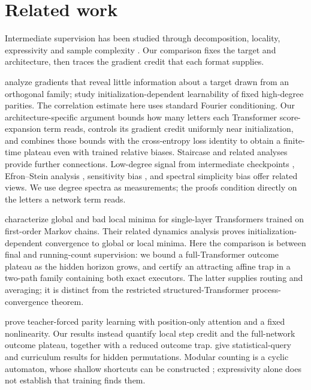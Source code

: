 \section{Related work}
\label{sec:related}

Intermediate supervision has been studied through decomposition, locality, expressivity and
sample complexity \citep{nye2021scratchpads,wies2023subtask,prystawski2023think,abbe2024globality,
feng2023towards,merrill2024expressive,malach2023autoregressive,hanneke2026samplecomplexityautoregressivereasoning,wen2024sparse}.
Our comparison fixes the target and architecture, then traces the gradient credit that each format supplies.

\citet{shalevshwartz2017failures} analyze gradients that reveal little information
about a target drawn from an orthogonal family; \citet{abbe2025parities} study
initialization-dependent learnability of fixed high-degree parities.
The correlation estimate here uses standard Fourier conditioning. Our architecture-specific
argument bounds how many letters each Transformer score-expansion term reads, controls
its gradient credit uniformly near initialization, and combines those bounds with the
cross-entropy loss identity to obtain a finite-time plateau even with trained relative biases.
Staircase and related analyses
\citep{abbe2021staircase,abbe2022mergedstaircase,abbe2023sgd} provide further connections.
Low-degree signal from intermediate checkpoints \citep{panigrahi2025progressive}, Efron--Stein
analysis \citep{li2025noise}, sensitivity bias \citep{hahn2024sensitive}, and spectral simplicity
bias \citep{yang2019spectral} offer related views. We use degree spectra as measurements;
the proofs condition directly on the letters a network term reads.

\citet{makkuva2025attention} characterize global and bad local minima for single-layer
Transformers trained on first-order Markov chains. Their related dynamics analysis
\citep{makkuva2024local} proves initialization-dependent convergence to global or local
minima. Here the comparison is between final and running-count supervision:
we bound a full-Transformer outcome plateau as the hidden horizon grows, and certify
an attracting affine trap in a two-path family containing both exact executors.
The latter supplies routing and averaging; it is distinct from the restricted
structured-Transformer process-convergence theorem.

\citet{kim2024parity} prove teacher-forced parity learning with position-only attention and a fixed
nonlinearity. Our results instead quantify local step credit and the full-network
outcome plateau, together with a reduced outcome trap. \citet{wang2025compositional} give statistical-query
and curriculum results for hidden permutations. Modular counting is a cyclic automaton,
whose shallow shortcuts can be constructed \citep{liu2023automata}; expressivity alone does
not establish that training finds them.

